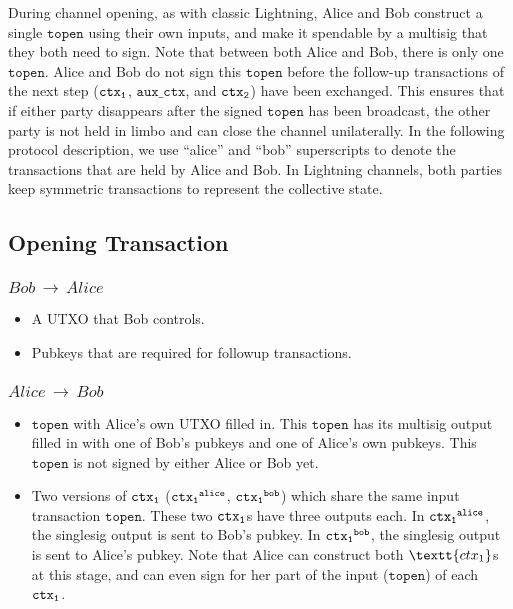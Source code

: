 During channel opening, as with classic Lightning, Alice and Bob construct a single $\texttt{topen}$ using their own inputs, and make it spendable by a multisig that they both need to sign. Note that between both Alice and Bob, there is only one $\texttt{topen}$. Alice and Bob do not sign this $\texttt{topen}$ before the follow-up transactions of the next step ($\texttt{ctx\textsubscript{1}}$, $\texttt{aux\_ctx}$, and $\texttt{ctx\textsubscript{2}}$) have been exchanged. This ensures that if either party disappears after the signed $\texttt{topen}$ has been broadcast, the other party is not held in limbo and can close the channel unilaterally. In the following protocol description, we use ``alice'' and ``bob'' superscripts to denote the transactions that are held by Alice and Bob. In Lightning channels, both parties keep symmetric transactions to represent the collective state. 

\subsection{Opening Transaction}
\subsubsection{$Bob\,\to\,Alice$}
\begin{itemize}[leftmargin=4\parindent]
    \item A UTXO that Bob controls.
    \item Pubkeys that are required for followup transactions.
\end{itemize}
\subsubsection{$Alice\,\to\,Bob$}
\begin{itemize}[leftmargin=4\parindent]
    \item $\texttt{topen}$ with Alice's own UTXO filled in. This $\texttt{topen}$ has its multisig output filled in with one of Bob's pubkeys and one of Alice's own pubkeys. This $\texttt{topen}$ is not signed by either Alice or Bob yet.
    \item Two versions of $\texttt{ctx\textsubscript{1}}$ ($\texttt{ctx\textsubscript{1}\textsuperscript{alice}}$, $\texttt{ctx\textsubscript{1}\textsuperscript{bob}}$) which share the same input transaction $\texttt{topen}$. These two $\texttt{ctx\textsubscript{1}}$s have three outputs each. In $\texttt{ctx\textsubscript{1}\textsuperscript{alice}}$, the  singlesig output is sent to Bob's pubkey. In $\texttt{ctx\textsubscript{1}\textsuperscript{bob}}$, the  singlesig output is sent to Alice's pubkey. Note that Alice can construct both $\textt{ctx\textsubscript{1}}$s at this stage, and can even sign for her part of the input ($\texttt{topen}$) of each $\texttt{ctx\textsubscript{1}}$.
\end{itemize}
